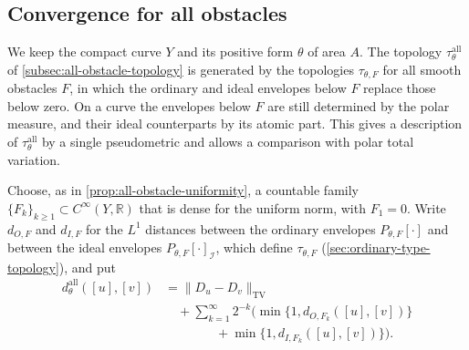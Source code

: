 \subsection{Convergence for all obstacles}
\label{subsec:curve-all-obstacle-topology}

We keep the compact curve $Y$ and its positive form $\theta$ of area $A$. The topology $\tau^{\mathrm{all}}_\theta$ of \cref{subsec:all-obstacle-topology} is generated by the topologies $\tau_{\theta,F}$ for all smooth obstacles $F$, in which the ordinary and ideal envelopes below $F$ replace those below zero. On a curve the envelopes below $F$ are still determined by the polar measure, and their ideal counterparts by its atomic part. This gives a description of $\tau^{\mathrm{all}}_\theta$ by a single pseudometric and allows a comparison with polar total variation.

Choose, as in \cref{prop:all-obstacle-uniformity}, a countable family $\{F_k\}_{k\geq1}\subset C^\infty(Y,\mathbb R)$ that is dense for the uniform norm, with $F_1=0$. Write $d_{O,F}$ and $d_{I,F}$ for the $L^1$ distances between the ordinary envelopes $P_{\theta,F}[\cdot]$ and between the ideal envelopes $P_{\theta,F}[\cdot]_{\mathcal I}$, which define $\tau_{\theta,F}$ (\cref{sec:ordinary-type-topology}), and put
\begin{equation}\label{eq:curve-all-obstacle-distance}
 \begin{split}
 d^{\mathrm{all}}_\theta([u],[v])
 &=\|D_u-D_v\|_{\mathrm{TV}}\\
 &\quad+\sum_{k=1}^\infty2^{-k}\bigl(\min\{1,d_{O,F_k}([u],[v])\}\\
 &\qquad\qquad+\min\{1,d_{I,F_k}([u],[v])\}\bigr).
 \end{split}
\end{equation}


